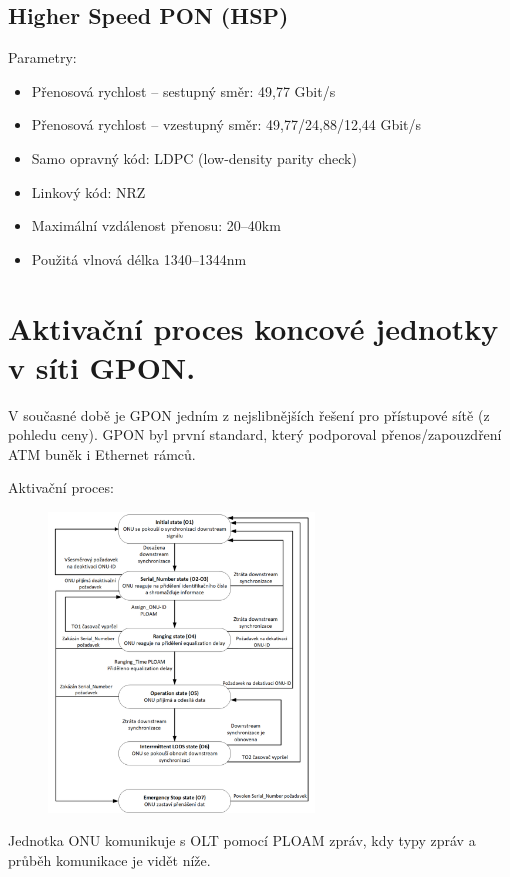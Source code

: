 \subsection{Higher Speed PON (HSP)}
Parametry:
\begin{itemize}
    \item Přenosová rychlost – sestupný směr: 49,77 Gbit/s
    \item Přenosová rychlost – vzestupný směr: 49,77/24,88/12,44 Gbit/s
    \item Samo opravný kód: LDPC (low-density parity check)
    \item Linkový kód: NRZ
    \item Maximální vzdálenost přenosu: 20–40km
    \item Použitá vlnová délka 1340–1344nm
\end{itemize}

\clearpage
\section{Aktivační proces koncové jednotky v síti GPON.}
V současné době je GPON jedním z nejslibnějších řešení pro přístupové sítě (z pohledu ceny). GPON byl první standard, který podporoval přenos/zapouzdření ATM buněk i Ethernet rámců.

Aktivační proces:
\begin{figure} [h]
    \centering
    \includegraphics[width=0.63\textwidth]{snimky/proces.png}
    \label{fig:gpon-proces}
\end{figure}

Jednotka ONU komunikuje s OLT pomocí PLOAM zpráv, kdy typy zpráv a průběh komunikace je vidět níže.

